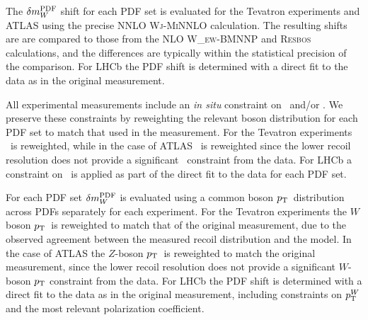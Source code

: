 
The $\delta m_W^{\scriptsize\textrm{PDF}}$ shift for each PDF set is evaluated for the
Tevatron experiments and ATLAS using the precise NNLO {\textsc{Wj-MiNNLO}} calculation.  
The resulting shifts are are compared to those from the NLO
{\textsc{W\_ew-BMNNP}} and {\textsc{Resbos}} calculations, and the differences are typically
within the statistical precision of the comparison.  For LHCb the PDF shift is determined
with a direct fit to the data as in the original measurement.

All experimental measurements include an {\it in situ} constraint on \pTZ~and/or \pTW.  We
preserve these constraints by reweighting the relevant boson \pT distribution for each PDF
set to match that used in the measurement.  For the Tevatron experiments \pTW~is reweighted,
while in the case of ATLAS \pTZ~is reweighted since the lower recoil resolution does not
provide a significant \pTW~constraint from the data.  For LHCb a constraint on \pTW~is applied
as part of the direct fit to the data for each PDF set.

For each PDF set $\delta m_W^{\scriptsize\textrm{PDF}}$ is evaluated using a common boson $p_{\scriptsize\textrm{T}}$~distribution
across PDFs separately for each experiment.  For the Tevatron experiments the $W$ boson $p_{\scriptsize\textrm{T}}$~is
reweighted to match that of the original measurement, due to the observed agreement between the measured
recoil distribution and the model.  In the case of ATLAS the $Z$-boson $p_{\scriptsize\textrm{T}}$~is reweighted to match the
original measurement, since the lower recoil resolution does not provide a significant $W$-boson
$p_{\scriptsize\textrm{T}}$ constraint from the data.
For LHCb the PDF shift is determined with a direct fit to the
data as in the original measurement, including constraints on $p_{\scriptsize\textrm{T}}^{W}$ and the most relevant polarization
coefficient.

